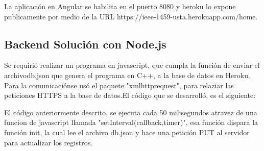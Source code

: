             
            
            

            La aplicación en Angular se habilita en el puerto 8080 y heroku lo expone publicamente por medio de la URL https://ieee-1459-usta.herokuapp.com/home.
    
    \subsection{Backend Solución con Node.js}

    Se requirió realizar un programa en javascript, que cumpla la función de enviar el archivodb.json que genera el programa en C++, a la base de datos en Heroku. Para la comunicaciónse usó el paquete "xmlhttprequest", para relaziar las peticiones HTTPS a la base de datos.El código que se desarrolló, es el siguiente:

        

        El código anteriormente descrito, se ejecuta cada 50 milisegundos atravez de una funcion de javascript llamada "setInterval(callback,timer)", esa función dispara la función init, la cual lee el archivo db.json y hace una petición PUT al servidor para actualizar los registros.

